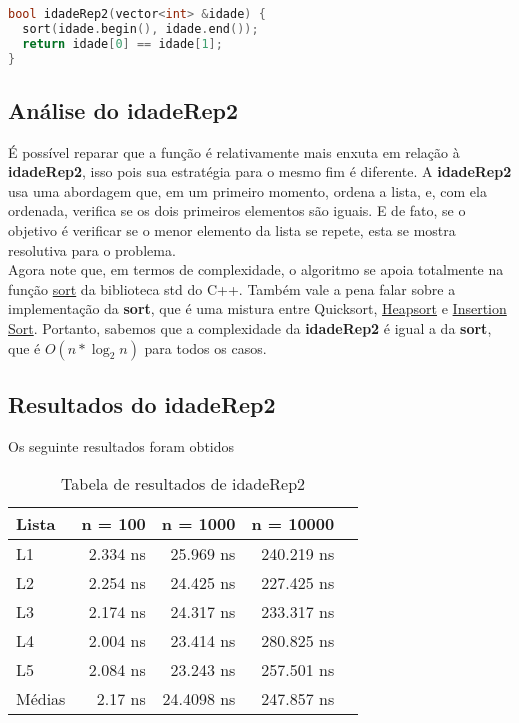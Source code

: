 \begin{lstlisting}[language=C++]
bool idadeRep2(vector<int> &idade) {
  sort(idade.begin(), idade.end());
  return idade[0] == idade[1];
}
\end{lstlisting}

\subsection{Análise do idadeRep2}

É possível reparar que a função é relativamente mais enxuta em relação à \textbf{idadeRep2}, isso pois sua estratégia para o mesmo fim é diferente. A \textbf{idadeRep2} usa uma abordagem que, em um primeiro momento, ordena a lista, e, com ela ordenada, verifica se os dois primeiros elementos são iguais. E de fato, se o objetivo é verificar se o menor elemento da lista se repete, esta se mostra resolutiva para o problema. \\
Agora note que, em termos de complexidade, o algoritmo se apoia totalmente na função \href{https://en.cppreference.com/w/cpp/algorithm/sort}{sort} da biblioteca std do C++. Também vale a pena falar sobre a implementação da \textbf{sort}, que é uma mistura entre Quicksort, \href{https://en.wikipedia.org/wiki/Heapsort}{Heapsort} e \href{https://en.wikipedia.org/wiki/Insertion_sort}{Insertion Sort}. Portanto, sabemos que a complexidade da \textbf{idadeRep2} é igual a da \textbf{sort}, que é $O(n*\log_2{n})$ para todos os casos.

\subsection{Resultados do idadeRep2}

Os seguinte resultados foram obtidos

\begin{table}[h!]
	\centering
	\caption{Tabela de resultados de idadeRep2}
	\label{tab:idade_rep2_result}
	\begin{tabular}{lrrrr}
		\toprule
		Lista   & n = 100   & n = 1000  & n = 10000 \\
		\midrule
		L1      & 2.334 ns    & 25.969 ns    & 240.219 ns  \\
		L2      & 2.254 ns    & 24.425 ns    & 227.425 ns  \\
		L3      & 2.174 ns    & 24.317 ns    & 233.317 ns  \\
		L4      & 2.004 ns    & 23.414 ns    & 280.825 ns  \\
		L5      & 2.084 ns    & 23.243 ns    & 257.501 ns  \\
		\midrule
		Médias  & 2.17 ns  & 24.4098 ns  &  247.857 ns \\
		\bottomrule
	\end{tabular}
\end{table}

